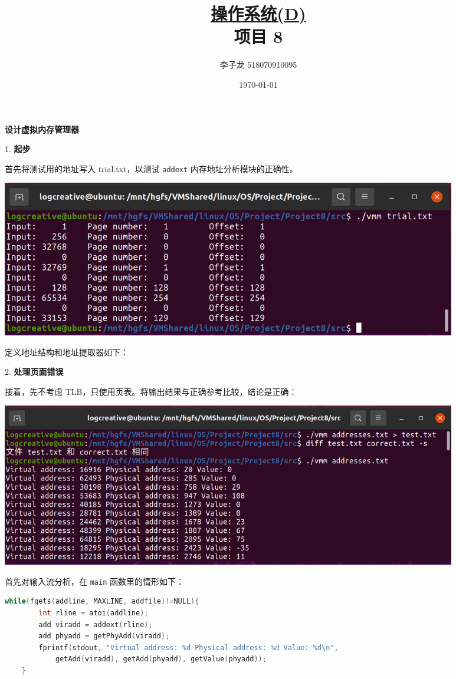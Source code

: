 \documentclass[12pt,a4paper]{article}
\newenvironment{problems}{\begin{list}{}{\renewcommand{\makelabel}[1]{\textbf{##1}\hfil}}}{\end{list}}
\providecommand{\code}[2]{}
\begin{document}
\title{\normalsize \underline{操作系统(D)}\\\LARGE 项目 8}
\author{李子龙 518070910095}
\date{\today}
\maketitle

\textbf{设计虚拟内存管理器}

\begin{problems}
    \item[1.] \textbf{起步}
    
    首先将测试用的地址写入 trial.txt，以测试 \verb"addext" 内存地址分析模块的正确性。
    \code{src/trial.txt}{}

    \includegraphics[width=0.88\textwidth]{trial.png}

    定义地址结构和地址提取器如下：
    \code{src/addext.h}{c}
    \code{src/addext.c}{c}
    
    \item[2.] \textbf{处理页面错误}
    
    接着，先不考虑 TLB，只使用页表。将输出结果与正确参考比较，结论是正确：

    \includegraphics[width=0.88\textwidth]{pagetab.png}

    首先对输入流分析，在 \verb"main" 函数里的情形如下：
    \begin{lstlisting}[language=c]
    while(fgets(addline, MAXLINE, addfile)!=NULL){
        int rline = atoi(addline);
        add viradd = addext(rline);
        add phyadd = getPhyAdd(viradd);
        fprintf(stdout, "Virtual address: %d Physical address: %d Value: %d\n", 
            getAdd(viradd), getAdd(phyadd), getValue(phyadd));
    }
    \end{lstlisting}


\end{problems}
\end{document}
